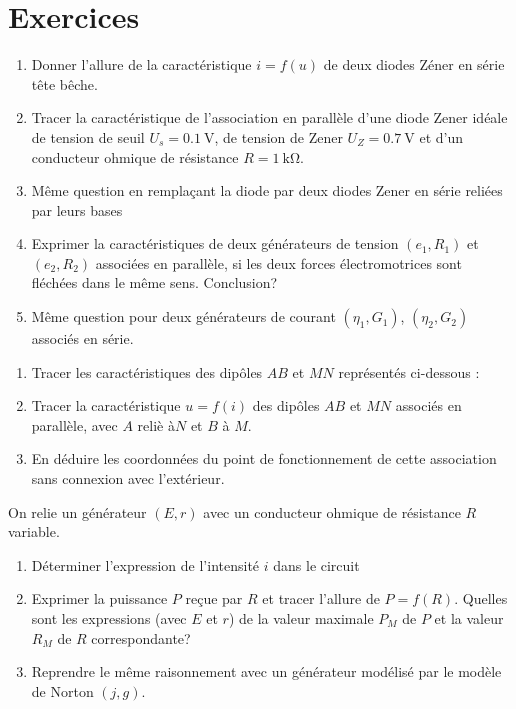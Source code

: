 \section{Exercices}%
\begin{exercice}%
  \begin{enumerate}
    \item Donner l'allure de la caractéristique \(i=f(u)\) de deux diodes Zéner 
      en série tête bêche.
    \item Tracer la caractéristique de l'association en parallèle d'une diode 
      Zener idéale de tension de seuil \(U_s=\SI{0.1}{\volt}\), de tension de 
      Zener \(U_Z = \SI{0.7}{\volt}\) et d'un conducteur ohmique de résistance 
      \(R=\SI{1}{\kilo\ohm}\).
    \item Même question en remplaçant la diode par deux diodes Zener en série 
      reliées par leurs bases
    \item Exprimer la caractéristiques de deux générateurs de tension \((e_1, 
      R_1)\) et \((e_2, R_2)\) associées en parallèle, si les deux forces 
      électromotrices sont fléchées dans le même sens. Conclusion?
    \item Même question pour deux générateurs de courant \((\eta_1, G_1)\), 
      \((\eta_2, G_2)\) associés en série.
  \end{enumerate}
\end{exercice}%
\begin{exercice}%
  \begin{enumerate}
    \item Tracer les caractéristiques des dipôles \(AB\) et \(MN\) représentés 
      ci-dessous :
    \item Tracer la caractéristique \(u=f(i)\) des dipôles \(AB\) et \(MN\) 
      associés en parallèle, avec \(A\) reliè à\(N\) et \(B\) à \(M\).
    \item En déduire les coordonnées du point de fonctionnement de cette 
      association sans connexion avec l'extérieur.
  \end{enumerate}
\end{exercice}%

\begin{exercice}%
  On relie un générateur \((E, r)\) avec un conducteur ohmique de résistance 
  \(R\) variable.
  \begin{enumerate}
    \item Déterminer l'expression de l'intensité \(i\) dans le circuit
    \item Exprimer la puissance \(P\) reçue par \(R\) et tracer l'allure de 
      \(P=f(R)\). Quelles sont les expressions (avec \(E\) et \(r\)) de la 
      valeur maximale \(P_M\) de \(P\) et la valeur \(R_M\) de \(R\) 
      correspondante?
    \item Reprendre le même raisonnement avec un générateur modélisé par le 
      modèle de Norton \((j, g)\).
  \end{enumerate}
\end{exercice}%

